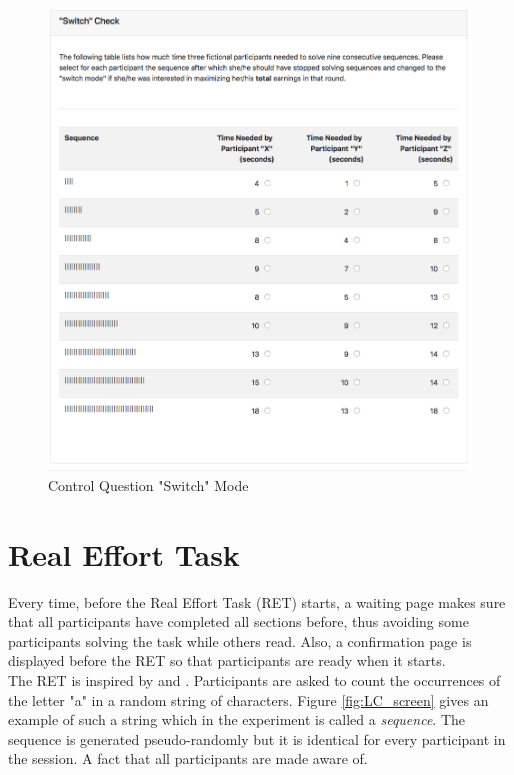     \begin{figure}
        \centering
        \includegraphics[width=\textwidth]{graphs/cq_switch.png}
        \caption{Control Question "Switch" Mode}
        \label{fig:cq_switch}
    \end{figure}
    
    
    \section{Real Effort Task}
    \label{ss:RET}
    
    Every time, before the Real Effort Task (RET) starts, a waiting page makes sure that all participants have completed all sections before, thus avoiding some participants solving the task while others read. Also, a confirmation page is displayed before the RET so that participants are ready when it starts.\\
    
    The RET is inspired by \cite{rey-biel2016} and \cite{giusti2014}. Participants are asked to count the occurrences of the letter "a" in a random string of characters. Figure \ref{fig:LC_screen} gives an example of such a string which in the experiment is called a \textit{sequence}. The sequence is generated pseudo-randomly but it is identical for every participant in the session. A fact that all participants are made aware of.\\ 
    
